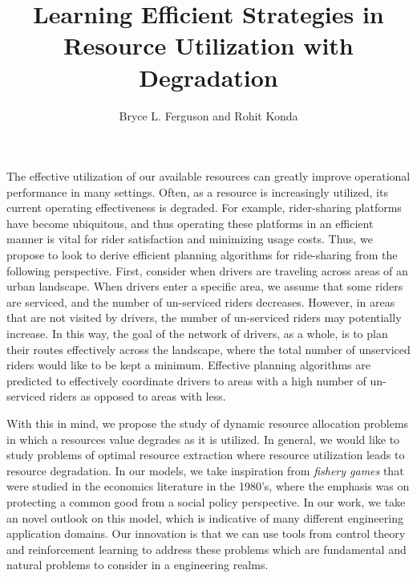 \documentclass[letterpaper, 10 pt, conference]{ieeeconf}
\begin{document}
\title{Learning Efficient Strategies in Resource Utilization with Degradation}
\author{Bryce L. Ferguson and Rohit Konda}

\maketitle
\thispagestyle{empty}


The effective utilization of our available resources can greatly improve operational performance in many settings. Often, as a resource is increasingly utilized, its current operating effectiveness is degraded. For example, rider-sharing platforms have become ubiquitous, and thus operating these platforms in an efficient manner is vital for rider satisfaction and minimizing usage costs. Thus, we propose to look to derive efficient planning algorithms for ride-sharing from the following perspective. First, consider when drivers are traveling across areas of an urban landscape. When drivers enter a specific area, we assume that some riders are serviced, and the number of un-serviced riders decreases. However, in areas that are not visited by drivers, the number of un-serviced riders may potentially increase. In this way, the goal of the network of drivers, as a whole, is to plan their routes effectively across the landscape, where the total number of unserviced riders would like to be kept a minimum. Effective planning algorithms are predicted to effectively coordinate drivers to areas with a high number of un-serviced riders as opposed to areas with less.

With this in mind, we propose the study of dynamic resource allocation problems in which a resources value degrades as it is utilized. In general, we would like to study problems of optimal resource extraction where resource utilization leads to resource degradation. In our models, we take inspiration from \emph{fishery games} that were studied in the economics literature in the 1980's, where the emphasis  was on protecting a common good from a social policy perspective. In our work, we take an novel outlook on this model, which is indicative of many different engineering application domains. Our innovation is that we can use tools from control theory and reinforcement learning to address these problems which are fundamental and natural problems to consider in a engineering realms.
\end{document}
